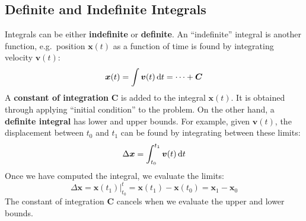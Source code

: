 \documentclass{../../../oss-handout}
\begin{document}
\subsection{Definite and Indefinite Integrals}
Integrals can be either \textbf{indefinite} or \textbf{definite}. An
``indefinite'' integral is another function, e.g.\ position $\bm{x}(t)$ as a
function of time is found by integrating velocity $\bm{v}(t)$:
\begin{equation*}
  \bm{x}(t)=\int\bm{v}(t)\dl t=\cdots+\bm{C}
\end{equation*}
A \textbf{constant of integration} $\bm{C}$ is added to the integral
$\bm{x}(t)$. It is obtained through applying ``initial condition'' to the
problem. On the other hand, a \textbf{definite integral} has lower and upper
bounds. For example, given $\bm{v}(t)$, the displacement between $t_0$ and
$t_1$ can be found by integrating between these limits:
\begin{equation*}
  \Delta\bm{x}=\int_{t_0}^{t_1} \bm{v}(t)\dl t
\end{equation*}
Once we have computed the integral, we evaluate the limits:
\begin{equation*}
  \Delta\bm{x} =
  \bm{x}(t_1)\Big|^t_{t_0}=
  \bm{x}(t_1)-\bm{x}(t_0)=
  \bm{x}_1-\bm{x}_0
\end{equation*}
The constant of integration $\bm{C}$ cancels when we evaluate the upper and
lower bounds.
\end{document}
